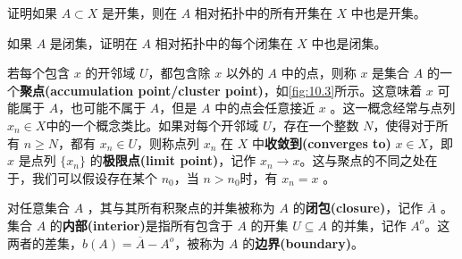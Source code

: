 \begin{exercise}
	证明如果 $A\subset X$ 是开集，则在 $A$ 相对拓扑中的所有开集在 $X$ 中也是开集。
\end{exercise}

\begin{exercise}
	如果 $A$ 是闭集，证明在 $A$ 相对拓扑中的每个闭集在 $X$ 中也是闭集。
\end{exercise}

	若每个包含 $x$ 的开邻域 $U$，都包含除 $x$ 以外的 $A$ 中的点，则称 $x$ 是集合 $A$ 的一个\textbf{聚点(accumulation point/cluster point)}，如\ref{fig:10.3}所示。这意味着 $x$ 可能属于 $A$，也可能不属于 $A$，但是 $A$ 中的点会任意接近 $x$ 。这一概念经常与点列 $x_{n} \in X$中的一个概念类比。如果对每个开邻域 $U$，存在一个整数 $N$，使得对于所有 $n\geq N$，都有 $x_{n} \in U$，则称点列 $x_{n}$ 在 $X$ 中\textbf{收敛到(converges to)} $x\in X$，即 $x$ 是点列 $\{x_{n} \}$ 的\textbf{极限点(limit point)}，记作 $x_{n}\rightarrow x$。这与聚点的不同之处在于，我们可以假设存在某个 $n_{0}$，当 $n >n_{0}$时，有 $x_{n} =x$ 。

	对任意集合 $A$ ，其与其所有积聚点的并集被称为 $A$ 的\textbf{闭包(closure)}，记作 $\overline{A}$ 。集合 $A$ 的\textbf{内部(interior)}是指所有包含于 $A$ 的开集 $U\subseteq A$ 的并集，记作 $A^{o}$。这两者的差集，$b(A)=\overline{A} -A^{o}$，被称为 $A$ 的\textbf{边界(boundary)}。

